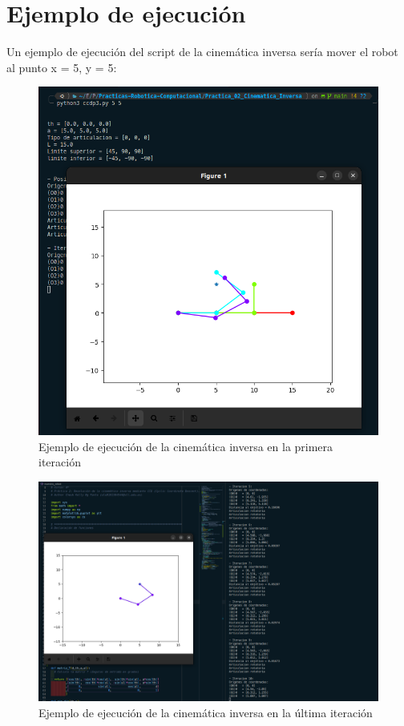 \documentclass[11pt]{report}
\begin{document}
\newpage

\section{Ejemplo de ejecución}
Un ejemplo de ejecución del script de la cinemática inversa sería mover el robot al punto x = 5, y = 5:
\begin{figure}[H]
  \centering
  \includegraphics[scale=0.35]{img/ejemplo_ci_1.png}
  \caption{Ejemplo de ejecución de la cinemática inversa en la primera iteración}
\end{figure}

\begin{figure}[H]
  \centering
  \includegraphics[scale=0.25]{img/ejemplo_ci_2.png}
  \caption{Ejemplo de ejecución de la cinemática inversa en la última iteración}
\end{figure}
\end{document}
